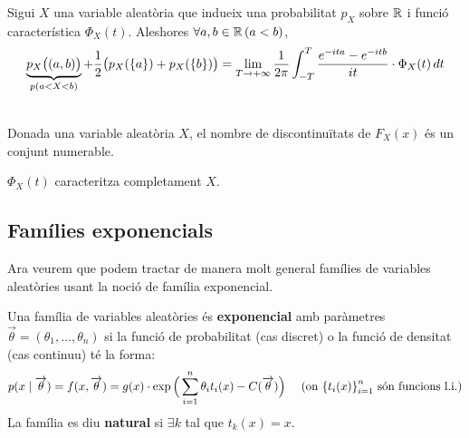 \begin{thm}[d'inversió]
  Sigui $X$ una variable aleatòria que indueix una probabilitat $p_{X}$ sobre $\mathbb{R}$ i 
  funció característica $\Phi_{X}(t)$. Aleshores $\forall a,b\in \mathbb{R} \, (a<b)$,
  \[
    \underbrace{p_{X}\big((a,b)\big)}_{p(a<X<b)} + \frac{1}{2}\big(p_{X}(\left\{a\right\})+p_{X}(\left\{b\right\}) \big) = \lim_{T\to+\infty}\frac{1}{2\pi}\int_{-T}^{T}\frac{e^{-ita}-e^{-itb}}{it}\cdot\Phi_{X}(t) \, dt
  \]
\end{thm}

\begin{lema} \-\\
  Donada una variable aleatòria $X$, el nombre de discontinuïtats de $F_{X}(x)$ és un conjunt numerable.
\end{lema}

\begin{col}
  $\Phi_{X}(t)$ caracteritza completament $X$.
\end{col}

\subsection{Famílies exponencials}

Ara veurem que podem tractar de manera molt general famílies de variables aleatòries usant 
la noció de família exponencial.

\begin{defi}
  Una família de variables aleatòries és \textbf{exponencial} amb paràmetres $\overrightarrow{\theta} = 
  (\theta_{1},\ldots,\theta_{n})$ si la funció de probabilitat (cas discret) o la funció de densitat (cas continuu) té la forma:
  \[
    p(x\mid \overrightarrow{\theta}) = f(x,\overrightarrow{\theta}) = g(x)\cdot 
    \exp\Big(\sum_{i=1}^{n}\theta_{i}t_{i}(x)-C(\overrightarrow{\theta})\Big) \quad \text{ (on $\left\{t_{i}(x)\right\}_{i=1}^{n}$ són funcions l.i.)}
  \]
  La família es diu \textbf{natural} si $\exists k$ tal que $t_{k}(x)=x$.
\end{defi}

